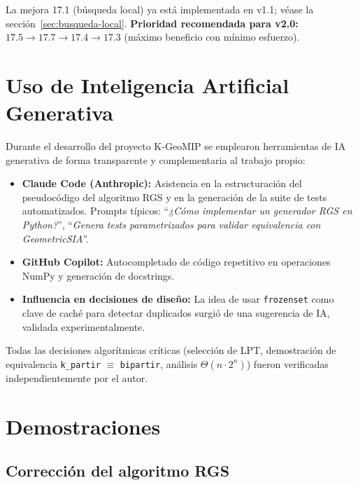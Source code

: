 \documentclass[12pt,letterpaper]{article}
\theoremstyle{definition}
\theoremstyle{remark}
\newcommand{\BigTheta}[1]{\Theta(#1)}
\begin{document}
La mejora 17.1 (búsqueda local) ya está implementada en v1.1; véase la
sección~\ref{sec:busqueda-local}. \textbf{Prioridad recomendada para v2.0:}
$17.5 \to 17.7 \to 17.4 \to 17.3$ (máximo beneficio con mínimo esfuerzo).

\section{Uso de Inteligencia Artificial Generativa}

Durante el desarrollo del proyecto K-GeoMIP se emplearon herramientas de IA generativa
de forma transparente y complementaria al trabajo propio:

\begin{itemize}
  \item \textbf{Claude Code (Anthropic):} Asistencia en la estructuración del pseudocódigo
    del algoritmo RGS y en la generación de la suite de tests automatizados.
    Prompts típicos: ``\textit{¿Cómo implementar un generador RGS en Python?}'',
    ``\textit{Genera tests parametrizados para validar equivalencia con GeometricSIA}''.

  \item \textbf{GitHub Copilot:} Autocompletado de código repetitivo en operaciones
    NumPy y generación de docstrings.

  \item \textbf{Influencia en decisiones de diseño:} La idea de usar \texttt{frozenset}
    como clave de caché para detectar duplicados surgió de una sugerencia de IA,
    validada experimentalmente.
\end{itemize}

Todas las decisiones algorítmicas críticas (selección de LPT, demostración de equivalencia
\texttt{k\_partir} $\equiv$ \texttt{bipartir}, análisis $\BigTheta{n \cdot 2^n}$) fueron
verificadas independientemente por el autor.

\appendix

\section{Demostraciones}
\label{apx:demostraciones}

\subsection{Corrección del algoritmo RGS}
\end{document}
